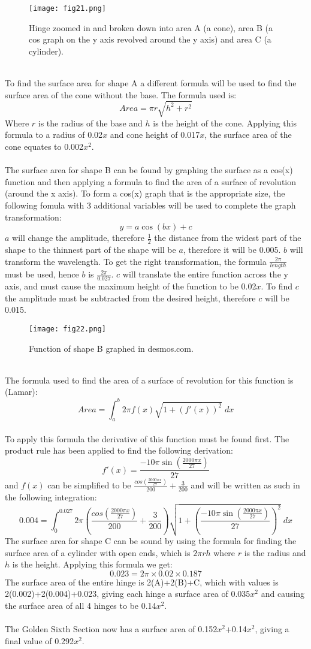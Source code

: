 \documentclass[a4paper,12pt]{article}
\begin{document}
\begin{figure}[h!]
\centering
\texttt{[image: fig21.png]}
\caption{Hinge zoomed in and broken down into area A (a cone), area B (a cos graph on the y axis revolved around the y axis) and area C (a cylinder).}
\label{fig:clock21}
\end{figure}\\To find the surface area for shape A a different formula will be used to find the surface area of the cone without the base. The formula used is: $$Area=\pi r\sqrt{h^2+r^2}$$ Where $r$ is the radius of the base and $h$ is the height of the cone. Applying this formula to a radius of 0.02$x$ and cone height of 0.017$x$, the surface area of the cone equates to 0.002$x^2$. \\\\The surface area for shape B can be found by graphing the surface as a cos(x) function and then applying a formula to find the area of a surface of revolution (around the x axis). To form a cos(x) graph that is the appropriate size, the following fomula with 3 additional variables will be used to complete the graph transformation: $$y=a\cos(bx)+c$$ $a$ will change the amplitude, therefore $\frac{1}{2}$ the distance from the widest part of the shape to the thinnest part of the shape will be $a$, therefore it will be 0.005. $b$ will transform the wavelength. To get the right transformation, the formula $\frac{2\pi}{length}$ must be used, hence $b$ is $\frac{2\pi}{0.027}$. $c$ will translate the entire function across the y axis, and must cause the maximum height of the function to be 0.02$x$. To find $c$ the amplitude must be subtracted from the desired height, therefore $c$ will be 0.015.
\begin{figure}[h!]
\centering
\texttt{[image: fig22.png]}
\caption{Function of shape B graphed in desmos.com.}
\label{fig:clock22}
\end{figure}\\The formula used to find the area of a surface of revolution for this function is (Lamar): $$Area=\int_{a}^{b}{2\pi f(x)\sqrt{1+(f'(x))^2}}\;dx$$ \\To apply this formula the derivative of this function must be found first. The product rule has been applied to find the following derivation: $$f'(x)=\frac{-10\pi\sin(\frac{2000\pi x}{27})}{27}$$ and $f(x)$ can be simplified to be $\frac{cos(\frac{2000\pi x}{27})}{200}+\frac{3}{200}$ and will be written as such in the following integration: $$0.004=\int_{0}^{0.027}{2\pi (\frac{cos(\frac{2000\pi x}{27})}{200}+\frac{3}{200})\sqrt{1+(\frac{-10\pi\sin(\frac{2000\pi x}{27})}{27})^2}}\;dx$$ The surface area for shape C can be sound by using the formula for finding the surface area of a cylinder with open ends, which is $2\pi rh$ where $r$ is the radius and $h$ is the height. Applying this formula we get: $$0.023=2\pi\times0.02\times0.187$$ The surface area of the entire hinge is 2(A)+2(B)+C, which with values is 2(0.002)+2(0.004)+0.023, giving each hinge a surface area of 0.035$x^2$ and causing the surface area of all 4 hinges to be 0.14$x^2$. \\\\The Golden Sixth Section now has a surface area of 0.152$x^2$+0.14$x^2$, giving a final value of 0.292$x^2$.
\end{document}
